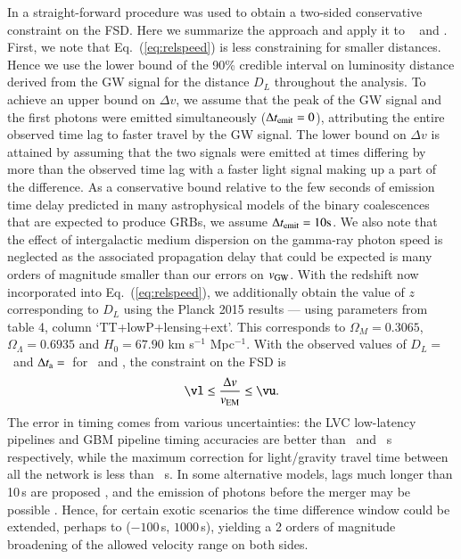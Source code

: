 \documentclass[aps,twocolumn,nofootinbib,nopreprintnumbers,showpacs,linenumbers,floatfix,longbibliography,superscriptaddress,prd]{revtex4-1}
\begin{document}
In \citet{abbott:2017bnsgrb} a straight-forward procedure 
was used to obtain a two-sided conservative constraint on the FSD.
Here we summarize the approach and apply it to \GWevent~ and \GRBevent.
First, we note that Eq.\ (\ref{eq:relspeed}) is less constraining for smaller
distances.  Hence we use the lower bound of the 90\% credible interval on luminosity distance
derived from the GW signal for the distance $D_L$ throughout the analysis.
To achieve an upper bound on $\Delta v$, we assume that the peak of the GW signal and
the first photons were emitted simultaneously ($\Delta t_{\rm emit}=0$), attributing the entire
observed time lag to faster travel by the GW signal.  The lower
bound on $\Delta v$ is attained by assuming that the two signals were emitted
at times differing by more than the observed time lag with a faster light
signal making up a part of the difference. As a conservative bound
relative to the few seconds of emission time delay predicted in many astrophysical models
of the binary coalescences that are expected to produce GRBs,
\cite{aDetObsScenario,Zhang_2019}
we assume $\Delta t_{\rm emit}= 10 {\rm s}$.  
We also note that the effect of intergalactic medium dispersion on
the gamma-ray photon speed is neglected as the associated propagation delay 
that could be expected is many orders of
magnitude smaller than our errors on $v_{\rm GW}$.
With the redshift now incorporated into Eq.\ (\ref{eq:relspeed}),
we additionally obtain the value of $z$
corresponding to $D_L$
using the Planck 2015 results \cite{ade:2015} --- using parameters from table 4, column `TT+lowP+lensing+ext'. This corresponds to $\Omega_M = 0.3065$, $\Omega_\Lambda = 0.6935$ and $H_0 = 67.90$ km s$^{-1}$ Mpc$^{-1}$.
With the observed values of $D_L=$\distance\
and $\Delta t_{\rm a}=$\tdelay\ for \GWevent~and \GRBevent,
the constraint on the
FSD is
\begin{equation}
\label{eq:speed_GR}
\vl \leq \frac{\Delta v}{v_{\rm EM}} \leq \vu.
\end{equation}
The error in timing comes from various uncertainties: the LVC low-latency pipelines and GBM pipeline timing accuracies are better than \dtErrorLVCpipe~and \dtErrorFermipipe~s respectively, while the maximum correction for light/gravity travel time between all the network is less than \dtErrorPos~s.
In some alternative models,
lags much longer than 10\,s are proposed 
\cite[e.g.,][]{ciolfi:15, rezzolla:15}, and the emission of photons
before the merger may be possible \cite{tsang:2012}.  Hence, for certain
exotic scenarios the time difference window could be extended, perhaps to ($-100$\,s,
$1000$\,s), yielding a 2 orders of magnitude broadening of the allowed
velocity range on both sides.  
\end{document}
